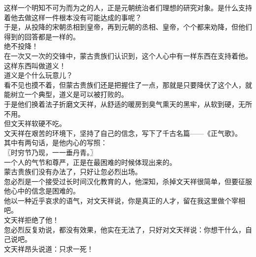 \begin{multicols}{\theparacolNo}
这样一个明知不可为而为之的人，正是元朝统治者们理想的研究对象。是什么支持着他去做这样一件根本没有可能达成的事呢？\\

于是，从投降的宋朝丞相到皇帝，再到元朝的丞相、皇帝，个个都来劝降，但他们得到的回答都是一样的。\\

绝不投降！\\

在一次又一次的交锋中，蒙古贵族们认识到，这个人心中有一样东西在支持着他。\\

这样东西叫做道义！\\

道义是个什么玩意儿？\\

看不见也摸不着，但蒙古贵族们还是把握住了一点，那就是只要降伏了这个人，就能树立一个典型，道义是可以被打败的。\\

于是他们换着法子折磨文天祥，从舒适的暖房到臭气熏天的黑牢，从软到硬，无所不用。\\

但文天祥软硬不吃。\\

文天祥在艰苦的环境下，坚持了自己的信念，写下了千古名篇——《正气歌》。\\

其中有两句话，是他内心的写照：\\

〖时穷节乃现，一一垂丹青。〗\\

一个人的气节和尊严，正是在最困难的时候体现出来的。\\

蒙古贵族们没有办法了，只好让忽必烈出场。\\

忽必烈是一个接受过长时间汉化教育的人，他深知，杀掉文天祥很简单，但要征服他心中的信念是困难的。\\

他以一种近乎哀求的语气，对文天祥说，你是真正的人才，留在我这里做个宰相吧。\\

文天祥拒绝了他！\\

忽必烈反复劝说，都没有效果，他实在无法了，只好对文天祥说：你想干什么，自己说吧。\\

文天祥昂头说道：只求一死！\\


\end{multicols}
